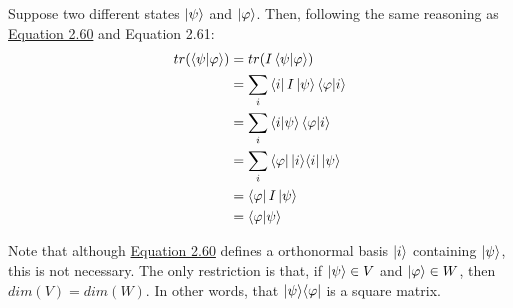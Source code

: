     Suppose two different states $\ket{\psi}$ and $\ket{\varphi}$. Then,
    following the same reasoning as \hyperref[sec:nielsen-and-chuang-equation-2-60]
    {Equation 2.60} and Equation 2.61:
    \begin{align}
        tr(\mathop{\mathinner{ \langle{\psi}|{\varphi}\rangle}}) &= tr(I\mathop{\mathinner{ \langle{\psi}|{\varphi}\rangle}}) \\
        &= \sum_i \bra{i} I \ket{\psi} \mathop{\mathinner{ \langle{\varphi}|{i}\rangle}} \\
        &= \sum_i \mathop{\mathinner{ \langle{i}|{\psi}\rangle}} \mathop{\mathinner{ \langle{\varphi}|{i}\rangle}} \\
        &= \sum_i \bra{\varphi} \mathop{\mathinner{ |{i}\rangle \langle{i}|}} \ket{\psi} \\
        &= \bra{\varphi} I \ket{\psi} \\
        &= \mathop{\mathinner{ \langle{\varphi}|{\psi}\rangle}}
    \end{align}
    
    Note that although \hyperref[sec:nielsen-and-chuang-equation-2-60]
    {Equation 2.60} defines a orthonormal basis $\ket{i}$ containing
    $\ket{\psi}$, this is not necessary.
    The only restriction is that, if $\ket{\psi} \in V$ and
    $\ket{\varphi} \in W$, then $dim(V) = dim(W)$.
    In other words, that $\mathop{\mathinner{ |{\psi}\rangle \langle{\varphi}|}}$ is a square matrix.